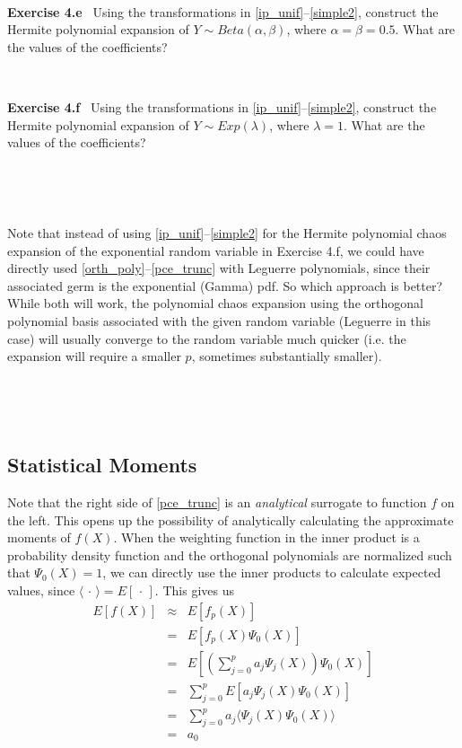 \documentclass[11pt]{article}
\numberwithin{equation}{section}
\begin{document}
\

\textbf{Exercise 4.e} \ Using the transformations in \eqref{ip_unif}--\eqref{simple2}, construct the Hermite polynomial expansion of $Y \sim Beta(\alpha, \beta)$, where $\alpha = \beta = 0.5$. What are the values of the coefficients?

\

\textbf{Exercise 4.f} \ Using the transformations in \eqref{ip_unif}--\eqref{simple2}, construct the Hermite polynomial expansion of $Y \sim Exp(\lambda)$, where $\lambda = 1$. What are the values of the coefficients?

\

\

Note that instead of using \eqref{ip_unif}--\eqref{simple2} for the Hermite polynomial chaos expansion of the exponential random variable in Exercise 4.f, we could have directly used \eqref{orth_poly}--\eqref{pce_trunc} with Leguerre polynomials, since their associated germ is the exponential (Gamma) pdf. So which approach is better? While both will work, the polynomial chaos expansion using the orthogonal polynomial basis associated with the given random variable (Leguerre in this case) will usually converge to the random variable much quicker (i.e. the expansion will require a smaller $p$, sometimes substantially smaller).

\

\


\subsection{Statistical Moments}

Note that the right side of \eqref{pce_trunc} is an {\em analytical} surrogate to function $f$ on the left. This opens up the possibility of analytically calculating the approximate moments of $f(X)$. When the weighting function in the inner product is a probability density function and the orthogonal polynomials are normalized such that $\Psi_0(X) = 1$, we can directly use the inner products to calculate expected values, since $\langle \, \cdot \, \rangle = E[ \, \cdot \, ]$. This gives us
\begin{eqnarray}
E [ f(X) ] & \approx & E [ f_p(X) ] \nonumber \\
& = & E [ f_p(X) \Psi_0(X) ] \nonumber \\
& = & E \left[ \left( \sum_{j = 0}^p a_j \Psi_j(X) \right) \Psi_0(X) \right] \nonumber \\
& = & \sum_{j = 0}^p  E \left[ a_j \Psi_j(X) \Psi_0(X) \right] \nonumber \\
& = & \sum_{j = 0}^p   a_j \langle \Psi_j(X) \Psi_0(X) \rangle  \nonumber \\
& = & a_0 \label{pce_mu}
\end{eqnarray}
\end{document}
